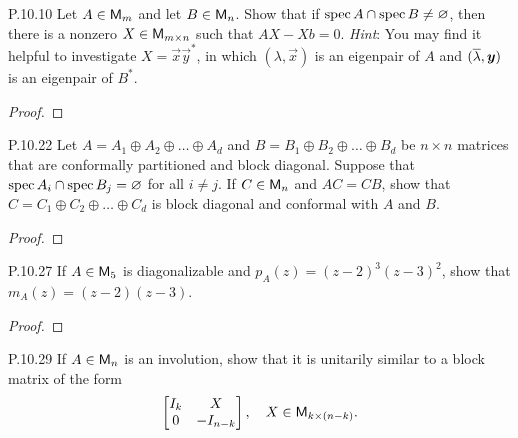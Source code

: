 \documentclass{../homework}
\date{Tuesday 4/9}
\author{}
\begin{document}
\begin{problems}
\item[P.10.10] Let \(A \in \mathsf{M}_m\) and let \(B \in \mathsf{M}_n\).  Show that
  if \(\operatorname{spec} A \cap \operatorname{spec} B \ne \varnothing\), then there is a nonzero
  \(X \in \mathsf{M}_{m \times n}\) such that \(AX - Xb = 0\).  \textit{Hint}:
  You may find it helpful to investigate \(X = \vec x \vec y^*\), in
  which \((\lambda, \vec x)\) is an eigenpair of \(A\) and
  \((\conj\lambda, \vec y)\) is an eigenpair of \(B^*\).

  \begin{solution}
    \begin{proof}

    \end{proof}
  \end{solution}

\item[P.10.22] Let \(A = A_1 \oplus A_2 \oplus \dots \oplus A_d\) and
  \(B = B_1 \oplus B_2 \oplus \dots \oplus B_d\) be \(n \times n\)
  matrices that are conformally partitioned and block diagonal.
  Suppose that \(\operatorname{spec} A_i \cap \operatorname{spec} B_j = \varnothing\) for all
  \(i \ne j\).  If \(C \in \mathsf{M}_n\) and \(AC = CB\), show that
  \(C = C_1 \oplus C_2 \oplus \dots \oplus C_d\) is block diagonal and
  conformal with \(A\) and \(B\).

  \begin{solution}
    \begin{proof}

    \end{proof}
  \end{solution}

\item[P.10.27] If \(A \in \mathsf{M}_5\) is diagonalizable and
  \(p_A(z) = (z-2)^3 (z-3)^2\), show that \(m_A(z) = (z-2)(z-3)\).

  \begin{solution}
    \begin{proof}

    \end{proof}
  \end{solution}

\item[P.10.29] If \(A \in \mathsf{M}_n\) is an involution, show that it is
  unitarily similar to a block matrix of the form
  \[
    \begin{bmatrix}
      I_k & X \\ 0 & -I_{n-k}
    \end{bmatrix},
    \quad X \in \mathsf{M}_{k \times (n-k)}.
  \]


\end{problems}
\end{document}
